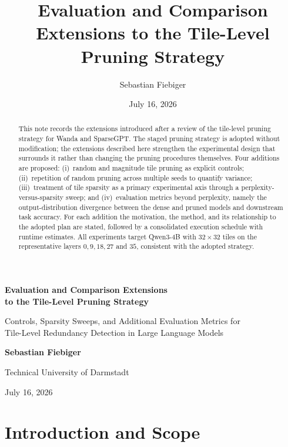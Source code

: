 \documentclass[11pt]{article}
\title{Evaluation and Comparison Extensions to the Tile-Level Pruning Strategy}
\author{Sebastian Fiebiger}
\date{July 16, 2026}
\begin{document}
\begin{titlepage}
\centering
\vspace*{4cm}
{\Huge\bfseries Evaluation and Comparison Extensions\\[0.3em]
to the Tile-Level Pruning Strategy\par}
\vspace{1.1cm}
{\large Controls, Sparsity Sweeps, and Additional Evaluation Metrics for\\
Tile-Level Redundancy Detection in Large Language Models\par}
\vspace{2.2cm}
{\large\bfseries Sebastian Fiebiger\par}
\vspace{0.3cm}
{\normalsize Technical University of Darmstadt\par}
\vfill
{\normalsize July 16, 2026\par}
\end{titlepage}

\begin{abstract}
This note records the extensions introduced after a review of the tile-level pruning strategy for
Wanda and SparseGPT. The staged pruning strategy is adopted without modification; the extensions
described here strengthen the experimental design that surrounds it rather than changing the pruning
procedures themselves. Four additions are proposed: (i)~random and magnitude tile pruning as explicit
controls; (ii)~repetition of random pruning across multiple seeds to quantify variance; (iii)~treatment
of tile sparsity as a primary experimental axis through a perplexity-versus-sparsity sweep; and
(iv)~evaluation metrics beyond perplexity, namely the output-distribution divergence between the dense
and pruned models and downstream task accuracy. For each addition the motivation, the method, and its
relationship to the adopted plan are stated, followed by a consolidated execution schedule with runtime
estimates. All experiments target Qwen3-4B with $32\times32$ tiles on the representative layers
$0, 9, 18, 27$ and $35$, consistent with the adopted strategy.
\end{abstract}

\tableofcontents
\newpage

\section{Introduction and Scope}
\end{document}
